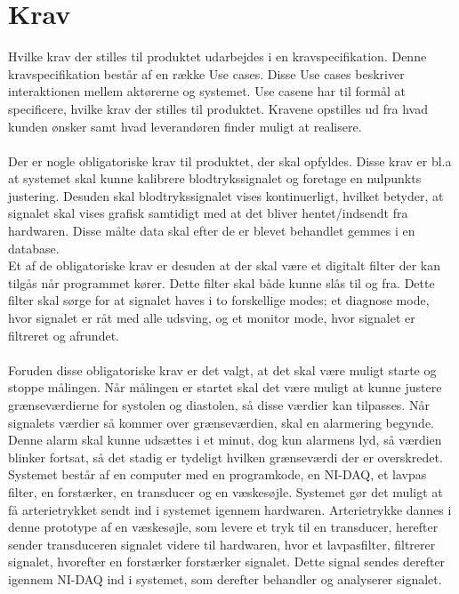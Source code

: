 \chapter{Krav}
Hvilke krav der stilles til produktet udarbejdes i en kravspecifikation. Denne kravspecifikation består af en række Use cases. Disse Use cases beskriver interaktionen mellem aktørerne og systemet. Use casene har til formål at specificere, hvilke krav der stilles til produktet. Kravene opstilles ud fra hvad kunden ønsker samt hvad leverandøren finder muligt at realisere. \\ \\
Der er nogle obligatoriske krav til produktet, der skal opfyldes. Disse krav er bl.a at systemet skal kunne kalibrere blodtrykssignalet og foretage en nulpunkts justering. Desuden skal blodtrykssignalet vises kontinuerligt, hvilket betyder, at signalet skal vises grafisk samtidigt med at det bliver hentet/indsendt fra hardwaren. Disse målte data skal efter de er blevet behandlet gemmes i en database.\\
Et af de obligatoriske krav er desuden at der skal være et digitalt filter der kan tilgås når programmet kører. Dette filter skal både kunne slås til og fra. Dette filter skal sørge for at signalet haves i to forskellige modes; et diagnose mode, hvor signalet er råt med alle udsving, og et monitor mode, hvor signalet er filtreret og afrundet.\\\\
Foruden disse obligatoriske krav er det valgt, at det skal være muligt starte og stoppe målingen. Når målingen er startet skal det være muligt at kunne justere grænseværdierne for systolen og diastolen, så disse værdier kan tilpasses. Når signalets værdier så kommer over grænseværdien, skal en alarmering begynde. Denne alarm skal kunne udsættes i et minut, dog kun alarmens lyd, så værdien blinker fortsat, så det stadig er tydeligt hvilken grænseværdi der er overskredet.\\
Systemet består af en computer med en programkode, en NI-DAQ, et lavpas filter, en forstærker, en transducer og en væskesøjle.
Systemet gør det muligt at få arterietrykket sendt ind i systemet igennem hardwaren. Arterietrykke dannes i denne prototype af en væskesøjle, som levere et tryk til en transducer, herefter sender transduceren signalet videre til hardwaren, hvor et lavpasfilter, filtrerer signalet, hvorefter en forstærker forstærker signalet. Dette signal sendes derefter igennem NI-DAQ ind i systemet, som derefter behandler og analyserer signalet.\\
